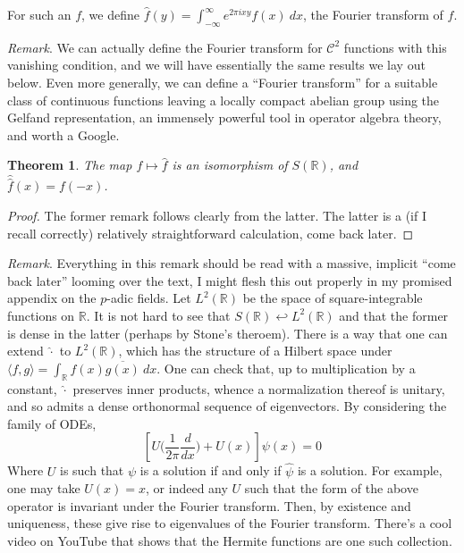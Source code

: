 \documentclass[12pt]{article}
\newcommand{\reals}{\mathbb{R}}
\newcommand{\iprod}[2]{\langle #1, #2 \rangle}
\newtheorem{thm}{Theorem}
\numberwithin{equation}{section}
\numberwithin{thm}{section}
\numberwithin{lemma}{section}
\numberwithin{cor}{section}
\begin{document}
For such an $f$, we define $\hat{f}(y) = \int_{- \infty}^{\infty} e^{2\pi i xy}f(x) \ dx$, the Fourier transform of $f$.

\textit{Remark}. We can actually define the Fourier transform for $\mathcal{C}^2$ functions with this vanishing condition, and we will have essentially the same results we lay out below. Even more generally, we can define a ``Fourier transform'' for a suitable class of continuous functions leaving a locally compact abelian group using the Gelfand representation, an immensely powerful tool in operator algebra theory, and worth a Google.

\begin{thm}
  The map $f \mapsto \hat{f}$ is an isomorphism of $S(\reals)$, and $\hat{\hat{f}}(x) = f(-x)$.
\end{thm}
\begin{proof}
  The former remark follows clearly from the latter. The latter is a (if I recall correctly) relatively straightforward calculation, come back later.
\end{proof}

\textit{Remark}. Everything in this remark should be read with a massive, implicit ``come back later'' looming over the text, I might flesh this out properly in my promised appendix on the $p$-adic fields. Let $L^2(\reals)$ be the space of square-integrable functions on $\reals$. It is not hard to see that $S(\reals) \hookleftarrow L^2(\reals)$ and that the former is dense in the latter (perhaps by Stone's theroem). There is a way that one can extend $\hat{\cdot}$ to $L^2(\reals)$, which has the structure of a Hilbert space under $\iprod{f}{g} = \int_{\reals} f(x)\overline{g(x)} \ dx$. One can check that, up to multiplication by a constant, $\hat{\cdot}$ preserves inner products, whence a normalization thereof is unitary, and so admits a dense orthonormal sequence of eigenvectors. By considering the family of ODEs, \begin{equation*}
  \left[ U \Bigg( \frac{1}{2\pi} \frac{d}{dx} \Bigg) + U(x) \right]\psi(x) = 0
\end{equation*} Where $U$ is such that $\psi$ is a solution if and only if $\hat{\psi}$ is a solution. For example, one may take $U(x) = x$, or indeed any $U$ such that the form of the above operator is invariant under the Fourier transform. Then, by existence and uniqueness, these give rise to eigenvalues of the Fourier transform. There's a cool video on YouTube that shows that the Hermite functions are one such collection.
\end{document}

